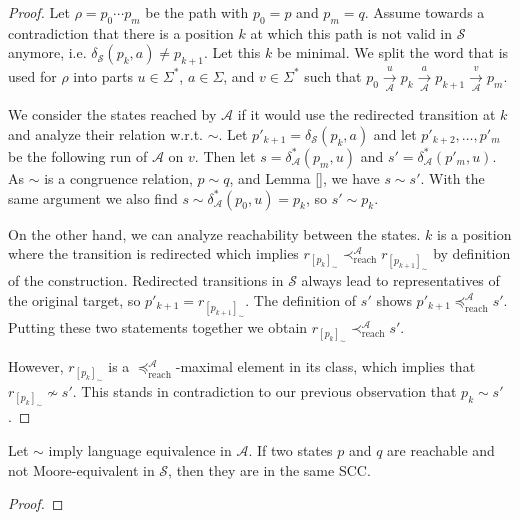 \begin{proof}
	Let $\rho = p_0 \cdots p_m$ be the path with $p_0 = p$ and $p_m = q$. Assume towards a contradiction that there is a position $k$ at which this path is not valid in $\mathcal{S}$ anymore, i.e. $\delta_\mathcal{S}(p_k, a) \neq p_{k+1}$. Let this $k$ be minimal. We split the word that is used for $\rho$ into parts $u \in \Sigma^*$, $a \in \Sigma$, and $v \in \Sigma^*$ such that $p_0 \overset{u}{\underset{\mathcal{A}}{\rightarrow}} p_k \overset{a}{\underset{\mathcal{A}}{\rightarrow}} p_{k+1} \overset{v}{\underset{\mathcal{A}}{\rightarrow}} p_m$.
	
	We consider the states reached by $\mathcal{A}$ if it would use the redirected transition at $k$ and analyze their relation w.r.t. $\sim$. Let $p'_{k+1} = \delta_\mathcal{S}(p_k, a)$ and let $p'_{k+2}, \dots, p'_m$ be the following run of $\mathcal{A}$ on $v$. Then let $s = \delta^*_\mathcal{A}(p_m, u)$ and $s' = \delta^*_\mathcal{A}(p'_m, u)$. As $\sim$ is a congruence relation, $p \sim q$, and Lemma \ref{}, we have $s \sim s'$. With the same argument we also find $s \sim \delta^*_\mathcal{A}(p_0, u) = p_k$, so $s' \sim p_k$.
	
	On the other hand, we can analyze reachability between the states. $k$ is a position where the transition is redirected which implies $r_{[p_k]_\sim} \prec_\text{reach}^\mathcal{A} r_{[p_{k+1}]_\sim}$ by definition of the construction. Redirected transitions in $\mathcal{S}$ always lead to representatives of the original target, so $p'_{k+1} = r_{[p_{k+1}]_\sim}$. The definition of $s'$ shows $p'_{k+1} \preceq_\text{reach}^\mathcal{A} s'$. Putting these two statements together we obtain $r_{[p_k]_\sim} \prec_\text{reach}^\mathcal{A} s'$.
	
	However, $r_{[p_k]_\sim}$ is a $\preceq_\text{reach}^\mathcal{A}$-maximal element in its class, which implies that $r_{[p_k]_\sim} \not\sim s'$. This stands in contradiction to our previous observation that $p_k \sim s'$.
\end{proof}

\newpage

\begin{lem}
	Let $\sim$ imply language equivalence in $\mathcal{A}$. If two states $p$ and $q$ are reachable and not Moore-equivalent in $\mathcal{S}$, then they are in the same SCC.
\end{lem}

\begin{proof}
\end{proof}









